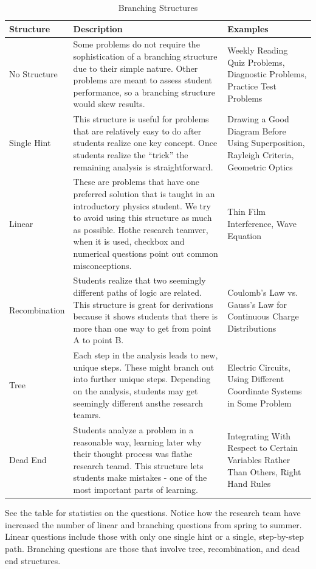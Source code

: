 \begin{table}[!ht]
  \centering
  \begin{tabular}{|p{2.7cm}|p{5.4cm}|p{4.6cm}|}
    \hline
    \textbf{Structure} & \textbf{Description} & \textbf{Examples}\\
	\hline
	No Structure & Some problems do not require the sophistication of a branching structure due to their simple nature. Other problems are meant to assess student performance, so a branching structure would skew results.
 & Weekly Reading Quiz Problems, Diagnostic Problems, Practice Test Problems\\
	\hline
	Single Hint & This structure is useful for problems that are relatively easy to do after students realize one key concept. Once students realize the ``trick'' the remaining analysis is straightforward. & Drawing a Good Diagram Before Using Superposition, Rayleigh Criteria, Geometric Optics\\
	\hline
	Linear & These are problems that have one preferred solution that is taught in an introductory physics student. We try to avoid using this structure as much as possible. Hothe research teamver, when it is used, checkbox and numerical questions point out common misconceptions. & Thin Film Interference, Wave Equation\\
	\hline
	Recombination & Students realize that two seemingly different paths of logic are related. This structure is great for derivations because it shows students that there is more than one way to get from point A to point B.
 & Coulomb’s Law vs. Gauss’s Law for Continuous Charge Distributions\\
	\hline
	Tree & Each step in the analysis leads to new, unique steps. These might branch out into further unique steps. Depending on the analysis, students may get seemingly different ansthe research teamrs. & Electric Circuits, Using Different Coordinate Systems in Some Problem\\
	\hline
	Dead End & Students analyze a problem in a reasonable way, learning later why their thought process was flathe research teamd. This structure lets students make mistakes - one of the most important parts of learning. & Integrating With Respect to Certain Variables Rather Than Others, Right Hand Rules\\
	\hline
  \end{tabular}
  \caption{Branching Structures}
  \label{tab:structures}
\end{table}

See the table for statistics on the questions. Notice how the research team have increased the number of linear and branching questions from spring to summer. Linear questions include those with only one single hint or a single, step-by-step path. Branching questions are those that involve tree, recombination, and dead end structures.

